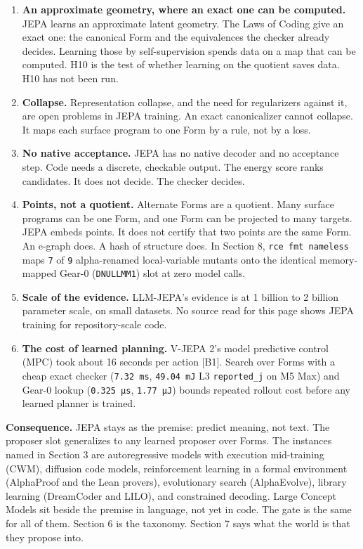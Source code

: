 \documentclass[10pt,letterpaper]{article}
\providecommand{\tightlist}{\setlength{\itemsep}{1pt}\setlength{\parskip}{0pt}}
\begin{document}
\begin{enumerate}
\def\labelenumi{\arabic{enumi}.}
\tightlist
\item
  \textbf{An approximate geometry, where an exact one can be computed.}
  JEPA learns an approximate latent geometry. The Laws of Coding give an
  exact one: the canonical Form and the equivalences the checker already
  decides. Learning those by self-supervision spends data on a map that
  can be computed. H10 is the test of whether learning on the quotient
  saves data. H10 has not been run.
\item
  \textbf{Collapse.} Representation collapse, and the need for
  regularizers against it, are open problems in JEPA training. An exact
  canonicalizer cannot collapse. It maps each surface program to one
  Form by a rule, not by a loss.
\item
  \textbf{No native acceptance.} JEPA has no native decoder and no
  acceptance step. Code needs a discrete, checkable output. The energy
  score ranks candidates. It does not decide. The checker decides.
\item
  \textbf{Points, not a quotient.} Alternate Forms are a quotient. Many
  surface programs can be one Form, and one Form can be projected to
  many targets. JEPA embeds points. It does not certify that two points
  are the same Form. An e-graph does. A hash of structure does. In
  Section 8, \texttt{rce\ fmt\ nameless} maps \texttt{7} of \texttt{9}
  alpha-renamed local-variable mutants onto the identical memory-mapped
  Gear-0 (\texttt{DNULLMM1}) slot at zero model calls.
\item
  \textbf{Scale of the evidence.} LLM-JEPA's evidence is at 1 billion to
  2 billion parameter scale, on small datasets. No source read for this
  page shows JEPA training for repository-scale code.
\item
  \textbf{The cost of learned planning.} V-JEPA 2's model predictive
  control (MPC) took about 16 seconds per action {[}B1{]}. Search over
  Forms with a cheap exact checker (\texttt{7.32\ ms},
  \texttt{49.04\ mJ} L3 \texttt{reported\_\allowbreak{}j} on M5 Max) and Gear-0
  lookup (\texttt{0.325\ µs}, \texttt{1.77\ µJ}) bounds repeated rollout
  cost before any learned planner is trained.
\end{enumerate}

\textbf{Consequence.} JEPA stays as the premise: predict meaning, not
text. The proposer slot generalizes to any learned proposer over Forms.
The instances named in Section 3 are autoregressive models with
execution mid-training (CWM), diffusion code models, reinforcement
learning in a formal environment (AlphaProof and the Lean provers),
evolutionary search (AlphaEvolve), library learning (DreamCoder and
LILO), and constrained decoding. Large Concept Models sit beside the
premise in language, not yet in code. The gate is the same for all of
them. Section 6 is the taxonomy. Section 7 says what the world is that
they propose into.
\end{document}
